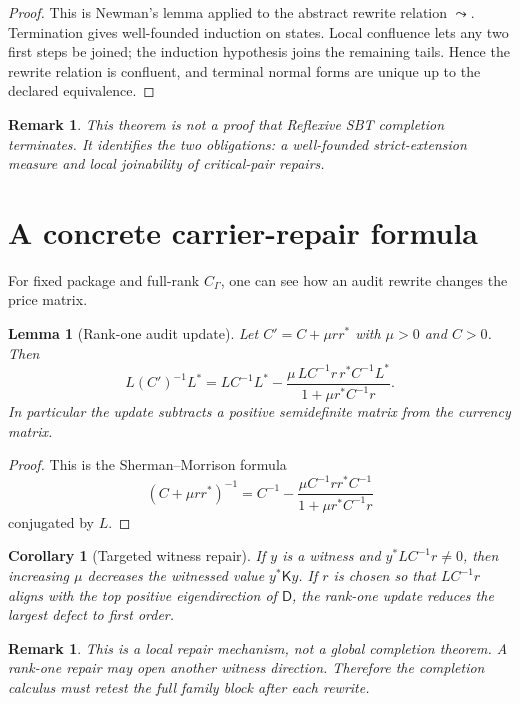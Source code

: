 \documentclass[11pt]{article}
\newtheorem{lemma}[theorem]{Lemma}
\newtheorem{corollary}[theorem]{Corollary}
\newtheorem{remark}[theorem]{Remark}
\newcommand{\K}{\mathsf K}
\newcommand{\D}{\mathsf D}
\begin{document}
\begin{proof}
This is Newman's lemma applied to the abstract rewrite relation $\leadsto$.  Termination gives well-founded induction on states.  Local confluence lets any two first steps be joined; the induction hypothesis joins the remaining tails.  Hence the rewrite relation is confluent, and terminal normal forms are unique up to the declared equivalence.
\end{proof}

\begin{remark}
This theorem is not a proof that Reflexive SBT completion terminates.  It identifies the two obligations: a well-founded strict-extension measure and local joinability of critical-pair repairs.
\end{remark}

\section{A concrete carrier-repair formula}

For fixed package and full-rank $C_\Gamma$, one can see how an audit rewrite changes the price matrix.

\begin{lemma}[Rank-one audit update]
Let $C' = C + \mu rr^*$ with $\mu>0$ and $C>0$.  Then
\[
L(C')^{-1}L^*
=
LC^{-1}L^*
-
\frac{\mu\,LC^{-1}r\,r^*C^{-1}L^*}{1+\mu r^*C^{-1}r}.
\]
In particular the update subtracts a positive semidefinite matrix from the currency matrix.
\end{lemma}

\begin{proof}
This is the Sherman--Morrison formula
\[
(C+\mu rr^*)^{-1}=C^{-1}-\frac{\mu C^{-1}rr^*C^{-1}}{1+\mu r^*C^{-1}r}
\]
conjugated by $L$.
\end{proof}

\begin{corollary}[Targeted witness repair]
If $y$ is a witness and $y^*LC^{-1}r\ne0$, then increasing $\mu$ decreases the witnessed value $y^*\K y$.  If $r$ is chosen so that $LC^{-1}r$ aligns with the top positive eigendirection of $\D$, the rank-one update reduces the largest defect to first order.
\end{corollary}

\begin{remark}
This is a local repair mechanism, not a global completion theorem.  A rank-one repair may open another witness direction.  Therefore the completion calculus must retest the full family block after each rewrite.
\end{remark}
\end{document}
